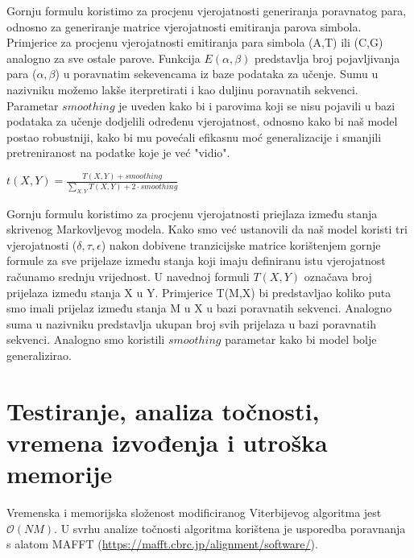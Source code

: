 \documentclass[a4paper]{article}
\begin{document}
Gornju formulu koristimo za procjenu vjerojatnosti generiranja poravnatog para, odnosno za generiranje matrice vjerojatnosti emitiranja parova simbola. Primjerice za procjenu vjerojatnosti emitiranja para simbola (A,T) ili (C,G) analogno za sve ostale parove. Funkcija $E(\alpha, \beta)$ predstavlja broj pojavljivanja para ($\alpha, \beta$) u poravnatim sekevencama iz baze podataka za učenje. Sumu u nazivniku možemo lakše iterpretirati i kao duljinu poravnatih sekvenci. Parametar $smoothing$ je uveden kako bi i parovima koji se nisu pojavili u bazi podataka za učenje dodjelili određenu vjerojatnost, odnosno kako bi naš model postao robustniji, kako bi mu povećali efikasnu moć generalizacije i smanjili pretreniranost na podatke koje je već "vidio". 


\begin{center}
$t(X, Y) = \frac{T(X, Y) + smoothing}{\sum_{X, Y} T(X, Y)  + 2\cdot smoothing}$
\end{center}


Gornju formulu koristimo za procjenu vjerojatnosti priejlaza između stanja skrivenog Markovljevog modela. Kako smo već ustanovili da naš model koristi tri vjerojatnosti ($\delta, \tau, \epsilon$) nakon dobivene tranzicijske matrice korištenjem gornje formule za sve prijelaze između stanja koji imaju definiranu istu vjerojatnost računamo srednju vrijednost. U navednoj formuli $T(X,Y)$ označava broj prijelaza između stanja X u Y. Primjerice T(M,X) bi predstavljao koliko puta smo imali prijelaz između stanja M u X u bazi poravnatih sekvenci. Analogno suma u nazivniku predstavlja ukupan broj svih prijelaza u bazi poravnatih sekvenci. Analogno smo koristili $smoothing$ parametar kako bi model bolje generalizirao.


\section{Testiranje, analiza točnosti, vremena izvođenja i utroška memorije}
Vremenska i memorijska složenost modificiranog Viterbijevog algoritma jest $\mathcal{O}(NM)$. U svrhu analize točnosti algoritma korištena je usporedba  poravnanja s alatom MAFFT (\url{https://mafft.cbrc.jp/alignment/software/}).\\
\end{document}

